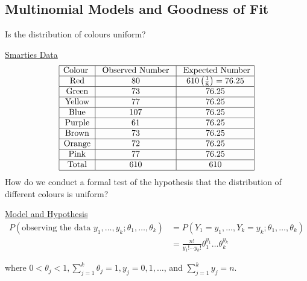 \documentclass[oneside]{book}
\begin{document}
\subsection{Multinomial Models and Goodness of Fit}
Is the distribution of colours uniform?

\underline{Smarties Data}
\[ \begin{array}{|c|c|c|}
        \hline
        \text{Colour } & \text{ Observed Number } & \text{ Expected Number}           \\
        \hline
        \text{Red}     & 80                       & 610\left(\frac{1}{8}\right)=76.25 \\
        \hline
        \text{Green}   & 73                       & 76.25                             \\
        \hline
        \text{Yellow}  & 77                       & 76.25                             \\
        \hline
        \text{Blue}    & 107                      & 76.25                             \\
        \hline
        \text{Purple}  & 61                       & 76.25                             \\
        \hline
        \text{Brown}   & 73                       & 76.25                             \\
        \hline
        \text{Orange}  & 72                       & 76.25                             \\
        \hline
        \text{Pink}    & 77                       & 76.25                             \\
        \hline
        \text{Total}   & 610                      & 610                               \\
        \hline
    \end{array} \]
How do we conduct a formal test of the hypothesis that the distribution of different
colours is uniform?

\underline{Model and Hypothesis}
\begin{align*}
    P\left(\text{observing the data } y_{1}, \ldots, y_{k} ; \theta_{1}, \ldots, \theta_{k}\right)
     & =P\left(Y_{1}=y_{1}, \ldots, Y_{k}=y_{k} ; \theta_{1}, \ldots, \theta_{k}\right) \\
     & =\frac{n !}{y_{1} ! \cdots y_{k} !} \theta_{1}^{y_{1}} \dots \theta_{k}^{y_{k}}
\end{align*}

where $0<\theta_{j}<1, \sum_{j=1}^{k} \theta_{j}=1, y_{j}=0,1, \ldots$, and $\sum_{j=1}^{k} y_{j}=n$.
\end{document}
